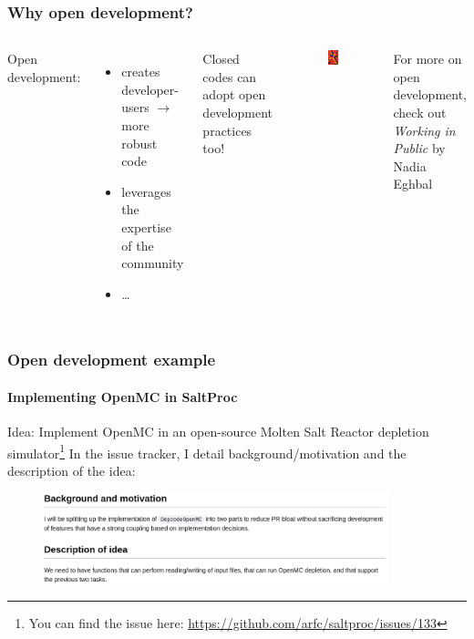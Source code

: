 \begin{frame}
  \frametitle{Why open development?} 
  \begin{columns}
      \column[t]{5cm}
      Open development:
      \begin{itemize}
          \item creates developer-users $\rightarrow$ more robust code
          \item leverages the expertise of the community 
          \item \ldots 
      \end{itemize}

      Closed codes can adopt open development practices too!

      \column[t]{5cm}
      \begin{figure}[htpb]
          \centering
          \includegraphics[width=2cm]{images/working-in-public.png}
      \end{figure}
      For more on open development, check out {\it Working in Public} by Nadia Eghbal \cite{eghbal_working_2020}

      
  \end{columns}
\end{frame}

\begin{frame}[fragile]
    \frametitle{Open development example}
    \framesubtitle{Implementing OpenMC in SaltProc}

    Idea: Implement OpenMC in an open-source Molten Salt Reactor depletion simulator\footnote{You can find the issue here: \url{https://github.com/arfc/saltproc/issues/133}} 
    \newline
    \newline
    In the issue tracker, I detail background/motivation and the description of the idea:


    \vspace{0.5cm}
    \begin{figure}[htpb]
        \centering
        \includegraphics[width=10cm]{images/open-dev-ex1.png}
    \end{figure}

    
\end{frame}

